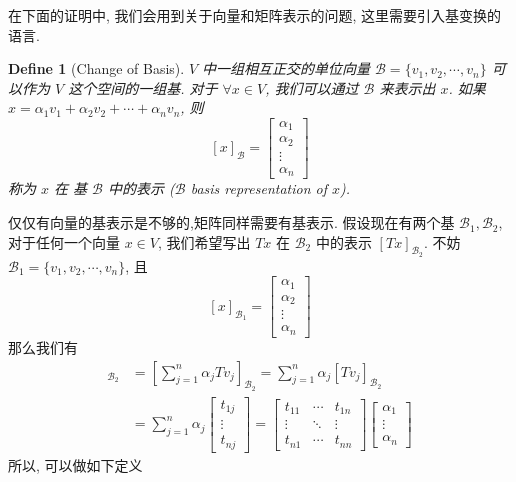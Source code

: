 \documentclass{article}
\newtheorem{define}{Define}
\begin{document}
在下面的证明中, 我们会用到关于向量和矩阵表示的问题, 这里需要引入基变换的语言.
\begin{define}[Change of Basis]
  $V$ 中一组相互正交的单位向量 $\mathcal{B} = \{v_1, v_2, \cdots, v_n\}$ 可以作为 $V$ 这个空间的一组基.
  对于 $\forall x\in V$, 我们可以通过 $\mathcal{B}$ 来表示出 $x$.
  如果 $x = \alpha_1v_1 + \alpha_2v_2 + \cdots + \alpha_nv_n$, 则
  \[[x]_{\mathcal{B}} = \left[
      \begin{array}{c}
        \alpha_1 \\
        \alpha_2 \\
        \vdots \\
        \alpha_n
      \end{array}
    \right]\]
  称为 $x$ 在 基 $\mathcal{B}$ 中的表示 ($\mathcal{B}$ basis representation of $x$).
\end{define}

仅仅有向量的基表示是不够的,矩阵同样需要有基表示.
假设现在有两个基 $\mathcal{B}_1, \mathcal{B}_2$, 对于任何一个向量 $x\in V$,
我们希望写出 $Tx$ 在 $\mathcal{B}_2$ 中的表示 $[Tx]_{\mathcal{B}_2}$.
不妨 $\mathcal{B}_1 = \{v_1, v_2, \cdots, v_n\}$, 且
\[[x]_{\mathcal{B}_1} = \left[
    \begin{array}{c}
      \alpha_1 \\
      \alpha_2 \\
      \vdots \\
      \alpha_n
    \end{array}
  \right]\]
那么我们有
\begin{align*}
  [Tx]_{\mathcal{B}_2} &= \left[\sum_{j=1}^n \alpha_jTv_j\right]_{\mathcal{B}_2} = \sum_{j=1}^n \alpha_j[Tv_j]_{\mathcal{B}_2}\\
    &= \sum_{j=1}^n \alpha_j \left[
        \begin{array}{c}
        t_{1j}\\
        \vdots \\
        t_{nj}
        \end{array}
  \right] = \left[
  \begin{array}{ccc}
    t_{11}&\cdots& t_{1n} \\
    \vdots & \ddots & \vdots \\
    t_{n1} & \cdots & t_{nn}
  \end{array}
  \right]\left[
    \begin{array}{c}
      \alpha_1 \\
      \vdots \\
      \alpha_n
    \end{array}
  \right]
\end{align*}
所以, 可以做如下定义
\end{document}
